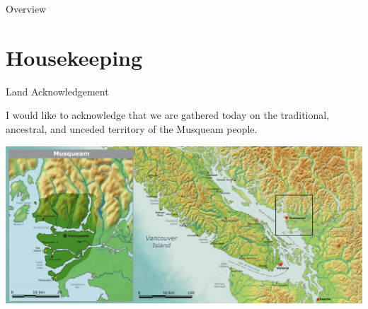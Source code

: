 \documentclass[aspectratio=169,xcolor=dvipsnames]{beamer}
\begin{document}
\begin{frame}{Overview}
    \tableofcontents
\end{frame}

\section{Housekeeping}

\begin{frame}{Land Acknowledgement}

I would like to acknowledge that we are gathered today on the traditional, ancestral, and unceded territory of the Musqueam people.

\vspace{0.2cm}
\begin{center}
\includegraphics[width=.9\textwidth]{imgs/musqueam}
\end{center}

\end{frame}

\end{document}
